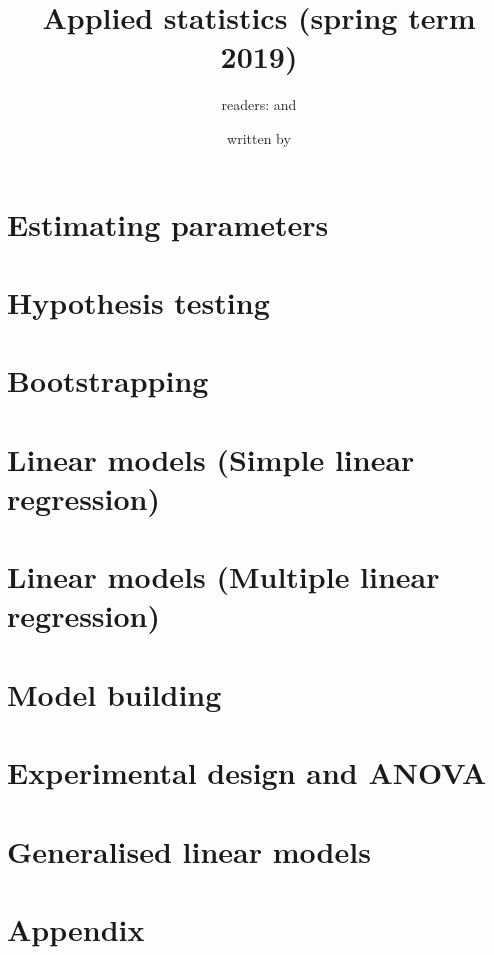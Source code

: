 \documentclass[british,a4paper,order=firstname]{mathscript}
\title{\textbf{Applied statistics (spring term 2019)}}
\author{readers: \person{Nikolai Bode} and \person{Ksenia Shalonova}}
\date{written by \person{Henry Haustein}}
\begin{document}
\pagestyle{plain}

\maketitle

\hypertarget{tocpage}{}
\tableofcontents
{}

\pagebreak
{}
\pagestyle{fancy}

\section{Estimating parameters}


\pagebreak
\section{Hypothesis testing}


\pagebreak
\section{Bootstrapping}

\pagebreak
\section{Linear models (Simple linear regression)}

\pagebreak
\section{Linear models (Multiple linear regression)}

\pagebreak
\section{Model building}

\pagebreak
\section{Experimental design and ANOVA}

\pagebreak
\section{Generalised linear models}


\pagebreak

\section{Appendix}



\printindex
\end{document}
